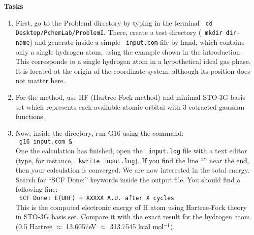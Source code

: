 \textbf{Tasks}
\begin{enumerate}
\item First, go to the Problem\textunderscore{}I directory by typing in the terminal \texttt{ cd Desktop/Pchem\textunderscore{}Lab/Problem\textunderscore{}I}. There, create a test directory (\texttt{ mkdir dir-name}) and generate inside a simple \texttt{ input.com} file by hand, which contains only a single hydrogen atom, using the example shown in the introduction. This corresponds to a single hydrogen atom in a hypothetical ideal gas phase. It is located at the origin of the coordinate system, although its position does not matter here.
 
\item For the method, use HF (Hartree-Fock method) and minimal STO-3G basis set which represents each available atomic orbital with 3 cotracted gaussian functions. 
 

\item Now, inside the directory, run G16 using the command: \\
  \texttt{ g16 input.com \& }\\ 
  One the calculation has finished, open the \texttt{ input.log} file with a text editor (type, for instance, \texttt{ kwrite input.log}). If you find the line ``'' near the end, then your calculation is converged. We are now interested in the total energy. Search for ``SCF Done:'' keywords inside the output file. You should find a following line:  \\
  \texttt{ SCF Done:  E(UHF) =  XXXXX     A.U.  after    X cycles} \\
  
This is the computed electronic energy of H atom using Hartree-Fock theory in STO-3G basis set. Compare it with the exact result for the hydrogen atom (0.5 Hartree $\approx$  13.6057eV $\approx$ 313.7545 kcal mol$^{-1}$).


\end{enumerate}
